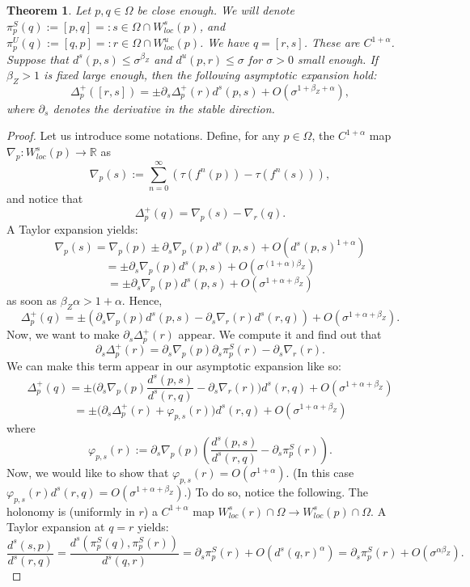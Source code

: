 \documentclass[a4paper]{article}
\newtheorem{theorem}{Theorem}[section]
\theoremstyle{definition}
\begin{document}
\begin{theorem}
Let $p,q \in \Omega$ be close enough. We will denote $\pi_p^{S}(q) := [p,q] =: s \in \Omega \cap W^s_{loc}(p)$, and  $\pi_p^U(q) := [q,p] =: r \in \Omega \cap W^u_{loc}(p)$. We have $q = [r,s]$. These  are $C^{1+\alpha}$. Suppose that $d^s(p,s) \leq \sigma^{\beta_Z}$ and $d^u(p,r) \leq \sigma$ for $\sigma>0$ small enough. If $\beta_Z>1$ is fixed large enough, then the following asymptotic expansion hold:
$$ \Delta_p^+([r,s]) = \pm  \partial_s \Delta_p^+(r) d^s(p,s) + O(\sigma^{1+\beta_Z+\alpha}) ,$$
where $\partial_s$ denotes the derivative in the stable direction.
\end{theorem}

\begin{proof}
Let us introduce some notations. Define, for any $p \in \Omega$, the $C^{1+\alpha}$ map $\nabla_p:W^s_{loc}(p) \rightarrow \mathbb{R}$ as $$ \nabla_p(s) := \sum_{n=0}^\infty \left(\tau( f^{n}(p) ) - \tau(f^n(s)) \right),$$
and notice that $$ \Delta_p^+(q) = \nabla_p(s) - \nabla_{r}(q) .$$
A Taylor expansion yields:
$$ \nabla_p(s) = \nabla_p(p) \pm \partial_s \nabla_p(p) d^s(p,s) + O(d^s(p,s)^{1+\alpha}) $$
$$ = \pm \partial_s \nabla_p(p) d^s(p,s) + O(\sigma^{(1+\alpha)\beta_Z}) $$
$$= \pm \partial_s \nabla_p(p) d^s(p,s) + O(\sigma^{1+\alpha+\beta_Z}) $$
as soon as $\beta_Z \alpha > 1 + \alpha$. Hence, $$ \Delta_p^+(q) = \pm\left( \partial_s \nabla_p(p) d^{s}(p,s) - \partial_s \nabla_r(r) d^{s}(r,q) \right) + O(\sigma^{1+\alpha+\beta_Z}) .$$
Now, we want to make $\partial_s \Delta_p^+(r)$ appear. We compute it and find out that
$$ \partial_s \Delta_p^+(r) = \partial_s \nabla_p( p ) \partial_s \pi_p^S(r) - \partial_s \nabla_r(r). $$
We can make this term appear in our asymptotic expansion like so:
$$ \Delta_p^+(q) = \pm\Big(  \partial_s \nabla_p(p) \frac{d^s(p,s)}{d^s(r,q)} - \partial_s \nabla_r(r) \Big) d^s(r,q) + O(\sigma^{1+\alpha+\beta_Z}) $$
$$ = \pm\Big(  \partial_s \Delta_p^+(r) + \varphi_{p,s}(r) \Big) d^s(r,q) + O(\sigma^{1+\alpha+\beta_Z}) $$
where $$\varphi_{p,s}(r) := \partial_s \nabla_p(p) \left(\frac{d^s(p,s)}{d^s(r,q)} - \partial_s\pi_p^S(r)\right).$$ Now, we would like to show that $\varphi_{p,s}(r) = O(\sigma^{1+\alpha})$.
(In this case $\varphi_{p,s}(r) d^s(r,q) = O(\sigma^{1+\alpha+\beta_Z})$.) To do so, notice the following. The holonomy is (uniformly in $r$) a $C^{1+\alpha}$ map $W^s_{loc}(r) \cap \Omega \rightarrow W^s_{loc}(p) \cap \Omega$. A Taylor expansion at $q=r$ yields:
$$ \frac{d^s(s,p)}{d^s(r,q)} = \frac{d^s(\pi_p^S(q),\pi_p^S(r))}{d^s(q,r)} = \partial_s \pi_p^S(r) + O(d^s(q,r)^\alpha) = \partial_s \pi_p^S(r) + O(\sigma^{\alpha \beta_Z}).$$

\end{proof}
\end{document}

